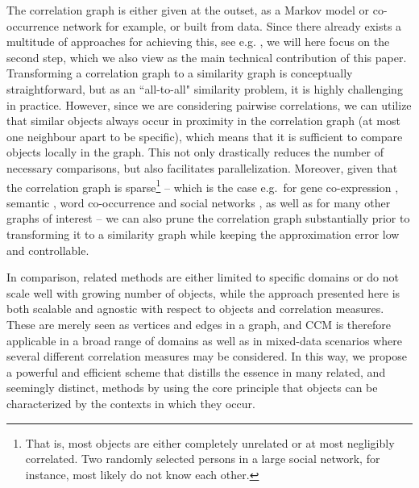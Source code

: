 \documentclass{kais}
\begin{document}
The correlation graph is either given at the outset, as a Markov model or co-occurrence network for example, or built from data.
Since there already exists a multitude of approaches for achieving this, see e.g. \cite{Albert2002}, we will here focus on the second 
step, which we also view as the main technical contribution of this paper. Transforming a correlation graph to a similarity graph 
is conceptually straightforward, but as an ``all-to-all" similarity
problem, it is highly challenging in practice. However, since we are considering
pairwise correlations, we can utilize that similar objects always occur in proximity in the correlation graph (at most one neighbour apart to 
be specific), which means that it is sufficient to compare objects locally in the graph. This not only drastically reduces the number 
of necessary comparisons,
but also facilitates parallelization. Moreover, given that the correlation graph is sparse\footnote{That is, most objects are 
either completely unrelated or at most negligibly correlated. Two randomly selected persons in a large social network, for 
instance, most likely do not know each other.} -- which is the case e.g.\ for gene co-expression \cite{Jordan2004}, semantic
 \cite{Steyvers2005}, word co-occurrence \cite{Cancho2001} and social networks \cite{mislove2007social}, as well as for 
 many other graphs of interest \cite{Albert2002} -- we can also prune the correlation graph substantially 
prior to transforming it to a similarity graph while keeping the approximation error low and controllable.

In comparison, related methods are either limited to specific domains 
or do not scale well with growing number of objects, while the approach presented here is both scalable and agnostic
with respect to objects and correlation measures. These are merely seen as vertices and edges in a graph, and CCM
is therefore applicable in a broad range of domains as well as in mixed-data scenarios where several different correlation measures
may be considered. In this way, we propose a powerful and efficient scheme that distills the essence in many related, and seemingly 
distinct, methods by using the core principle that objects can be characterized by the contexts in which they occur.
\end{document}
